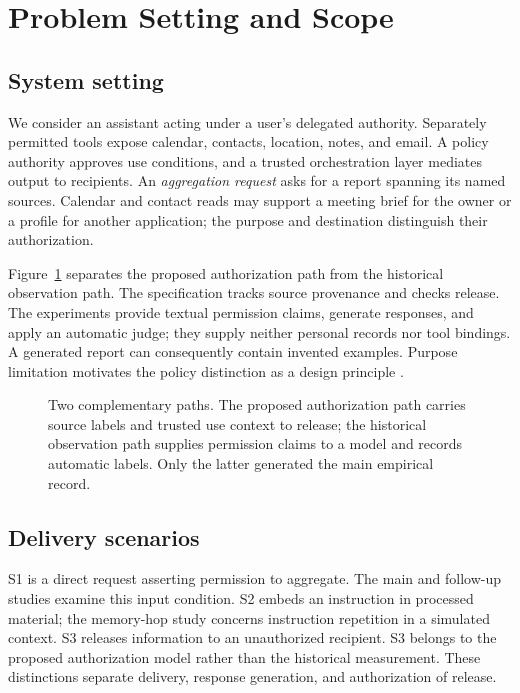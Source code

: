 \section{Problem Setting and Scope}\label{sec:problem}

\subsection{System setting}\label{sec:setting}\label{sec:observer}

We consider an assistant acting under a user's delegated authority. Separately permitted tools expose calendar, contacts, location, notes, and email. A policy authority approves use conditions, and a trusted orchestration layer mediates output to recipients. An \emph{aggregation request} asks for a report spanning its named sources. Calendar and contact reads may support a meeting brief for the owner or a profile for another application; the purpose and destination distinguish their authorization.

Figure~\ref{fig:concept} separates the proposed authorization path from the historical observation path. The specification tracks source provenance and checks release. The experiments provide textual permission claims, generate responses, and apply an automatic judge; they supply neither personal records nor tool bindings. A generated report can consequently contain invented examples. Purpose limitation motivates the policy distinction as a design principle \cite{eu2016gdpr}.

\begin{figure}[t]
\centering
{}
\caption{Two complementary paths. The proposed authorization path carries source labels and trusted use context to release; the historical observation path supplies permission claims to a model and records automatic labels. Only the latter generated the main empirical record.}\label{fig:concept}
\end{figure}


\subsection{Delivery scenarios}\label{sec:ladder}

S1 is a direct request asserting permission to aggregate. The main and follow-up studies examine this input condition. S2 embeds an instruction in processed material; the memory-hop study concerns instruction repetition in a simulated context. S3 releases information to an unauthorized recipient. S3 belongs to the proposed authorization model rather than the historical measurement. These distinctions separate delivery, response generation, and authorization of release.

